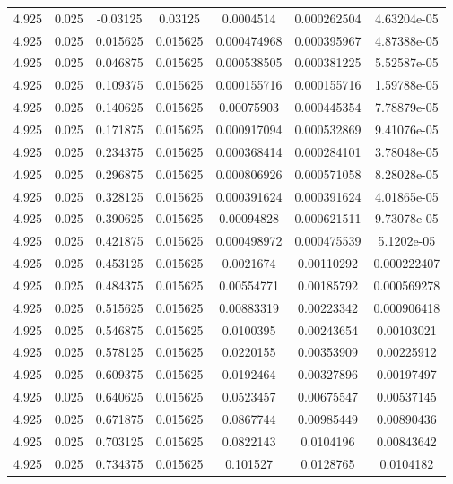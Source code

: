 \begin{table}[bh]
\begin{center}
{\begin{tabular}{ccccccc}
4.925	 & 0.025 & 	-0.03125	 & 0.03125	 & 0.0004514	 & 0.000262504	 & 4.63204e-05 \\ 
4.925	 & 0.025 & 	0.015625	 & 0.015625	 & 0.000474968	 & 0.000395967	 & 4.87388e-05 \\ 
4.925	 & 0.025 & 	0.046875	 & 0.015625	 & 0.000538505	 & 0.000381225	 & 5.52587e-05 \\ 
4.925	 & 0.025 & 	0.109375	 & 0.015625	 & 0.000155716	 & 0.000155716	 & 1.59788e-05 \\ 
4.925	 & 0.025 & 	0.140625	 & 0.015625	 & 0.00075903	 & 0.000445354	 & 7.78879e-05 \\ 
4.925	 & 0.025 & 	0.171875	 & 0.015625	 & 0.000917094	 & 0.000532869	 & 9.41076e-05 \\ 
4.925	 & 0.025 & 	0.234375	 & 0.015625	 & 0.000368414	 & 0.000284101	 & 3.78048e-05 \\ 
4.925	 & 0.025 & 	0.296875	 & 0.015625	 & 0.000806926	 & 0.000571058	 & 8.28028e-05 \\ 
4.925	 & 0.025 & 	0.328125	 & 0.015625	 & 0.000391624	 & 0.000391624	 & 4.01865e-05 \\ 
4.925	 & 0.025 & 	0.390625	 & 0.015625	 & 0.00094828	 & 0.000621511	 & 9.73078e-05 \\ 
4.925	 & 0.025 & 	0.421875	 & 0.015625	 & 0.000498972	 & 0.000475539	 & 5.1202e-05 \\ 
4.925	 & 0.025 & 	0.453125	 & 0.015625	 & 0.0021674	 & 0.00110292	 & 0.000222407 \\ 
4.925	 & 0.025 & 	0.484375	 & 0.015625	 & 0.00554771	 & 0.00185792	 & 0.000569278 \\ 
4.925	 & 0.025 & 	0.515625	 & 0.015625	 & 0.00883319	 & 0.00223342	 & 0.000906418 \\ 
4.925	 & 0.025 & 	0.546875	 & 0.015625	 & 0.0100395	 & 0.00243654	 & 0.00103021 \\ 
4.925	 & 0.025 & 	0.578125	 & 0.015625	 & 0.0220155	 & 0.00353909	 & 0.00225912 \\ 
4.925	 & 0.025 & 	0.609375	 & 0.015625	 & 0.0192464	 & 0.00327896	 & 0.00197497 \\ 
4.925	 & 0.025 & 	0.640625	 & 0.015625	 & 0.0523457	 & 0.00675547	 & 0.00537145 \\ 
4.925	 & 0.025 & 	0.671875	 & 0.015625	 & 0.0867744	 & 0.00985449	 & 0.00890436 \\ 
4.925	 & 0.025 & 	0.703125	 & 0.015625	 & 0.0822143	 & 0.0104196	 & 0.00843642 \\ 
4.925	 & 0.025 & 	0.734375	 & 0.015625	 & 0.101527	 & 0.0128765	 & 0.0104182 \\ 

\end{tabular}}
\end{center}
\end{table}
